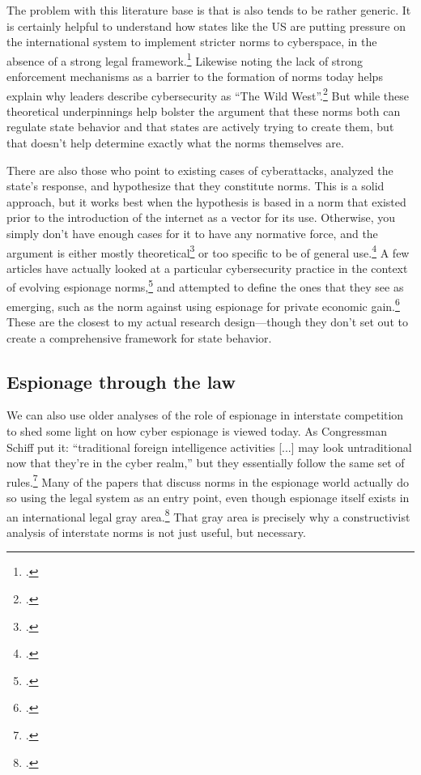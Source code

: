 \documentclass{report}
\begin{document}
\begin{refsegment}
The problem with this literature base is that is also tends to be rather generic. It is certainly helpful to understand how states like the US are putting pressure on the international system to implement stricter norms to cyberspace, in the absence of a strong legal framework.\footcite[~p.7]{finnemore_constructing_2016} Likewise noting the lack of strong enforcement mechanisms as a barrier to the formation of norms today helps explain why leaders describe cybersecurity as ``The Wild West''.\footcite{iasiello_what_2016} But while these theoretical underpinnings help bolster the argument that these norms both can regulate state behavior and that states are actively trying to create them, but that doesn't help determine exactly what the norms themselves are.

There are also those who point to existing cases of cyberattacks, analyzed the state's response, and hypothesize that they constitute norms. This is a solid approach, but it works best when the hypothesis is based in a norm that existed prior to the introduction of the internet as a vector for its use. Otherwise, you simply don't have enough cases for it to have any normative force, and the argument is either mostly theoretical\footcite{neutze_cyber_2013} or too specific to be of general use.\footcite{caso_rules_2014} A few articles have actually looked at a particular cybersecurity practice in the context of evolving espionage norms,\footcite{libicki_coming_2017} and attempted to define the ones that they see as emerging, such as the norm against using espionage for private economic gain.\footcite{rascoff_norm_2016} These are the closest to my actual research design---though they don't set out to create a comprehensive framework for state behavior.

\subsection{Espionage through the law}
We can also use older analyses of the role of espionage in interstate competition to shed some light on how cyber espionage is viewed today. As Congressman Schiff put it: ``traditional foreign intelligence activities [...] may look untraditional now that they’re in the cyber realm,'' but they essentially follow the same set of rules.\footcite{nakashima_hacks_2015} Many of the papers that discuss norms in the espionage world actually do so using the legal system as an entry point, even though espionage itself exists in an international legal gray area.\footcite{beim_enforcing_2018} That gray area is precisely why a constructivist analysis of interstate norms is not just useful, but necessary.


\end{refsegment}
\end{document}

